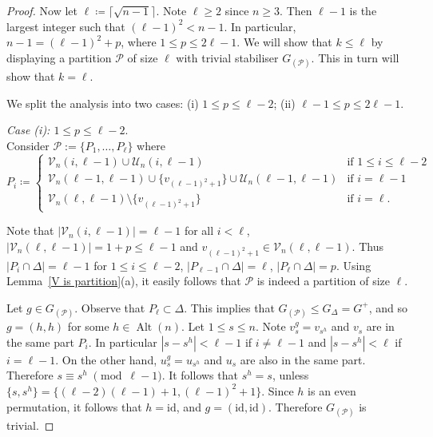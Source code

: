 \documentclass[11pt]{amsart}
\DeclareMathOperator{\Alt}{Alt}
\begin{document}
\begin{proof}
Now let $\ell \coloneqq \lceil \sqrt{n - 1} \rceil$. Note $\ell\geq 2$ since $n\geq 3$.
Then \(\ell-1\) is the largest integer such that \((\ell-1)^{2}<n-1\).
In particular, \(n-1=(\ell-1)^{2}+p\), where \(1 \leqslant p \leqslant 2\ell-1\).  We will show that \(k\leqslant \ell\) by displaying a partition \(\mathcal{P}\) of size \(\ell\) with trivial stabiliser \(G_{(\mathcal{P})}\). This in turn will show that \(k=\ell\).



We split the analysis into two cases: (i) \(1 \leqslant p\leqslant \ell-2\); (ii) \(\ell-1 \leqslant p \leqslant 2\ell-1\).

\emph{Case (i): \(1 \leqslant p\leqslant \ell-2\)}. \\
Consider \(\mathcal{P}:=\{P_{1},\ldots, P_{\ell}\}\) where
\begin{equation*} 
P_{i}  \coloneqq
\begin{cases}
   \mathcal{V}_n(i,\ell-1) \cup \mathcal{U}_n(i,\ell-1)& \text{if } 1\leqslant i \leqslant \ell-2\\ 
    \mathcal{V}_n(\ell-1,\ell-1) \cup \{v_{(\ell-1)^2+1}\}\cup \mathcal{U}_n(\ell-1,\ell-1)& \text{if } i= \ell-1\\ 
   \mathcal{V}_n(\ell,\ell-1)\setminus \{v_{(\ell-1)^2+1}\} & \text{if } i=\ell.
\end{cases}
\end{equation*} 

%
Note that $|\mathcal{V}_n(i,\ell-1)|=\ell-1$ for all $i<\ell$, $|\mathcal{V}_n(\ell,\ell-1)|=1+p\leqslant \ell-1$ and $v_{(\ell-1)^2+1}\in \mathcal{V}_n(\ell,\ell-1)$.
Thus $|P_{i}\cap\Delta|=\ell-1$ for $1\leqslant i \leqslant \ell-2$, $|P_{\ell-1}\cap\Delta|=\ell$, $|P_{\ell}\cap\Delta|=p$. Using Lemma~\ref{V is partition}(a), it easily follows that \(\mathcal{P}\) is indeed a partition of size $\ell$. 

Let \(g\in G_{(\mathcal{P})}\). 
Observe that \(P_{\ell}\subset\Delta\). This implies that \(G_{(\mathcal{P})}\leqslant G_{\Delta}= G^{+}\), and so $g=(h,h)$ for some $h\in \Alt(n)$. 
  Let $1\leqslant s\leqslant n$. Note $v_s^g=v_{s^h}$ and $v_s$ are in the same part $P_i$. In particular $ |s-s^h|<\ell-1$ if $i\neq \ell-1$ and $ |s-s^h|<\ell$ if $i=\ell-1$. On the other hand, $u_s^g=u_{s^h}$ and $u_s$ are also in the same part. Therefore $s\equiv s^h \;\pmod {\ell-1}$. It follows that $s^h=s$, unless $\{s,s^h\}=\{(\ell-2)(\ell-1)+1,(\ell-1)^2+1\}$. Since $h$ is an even permutation, it follows that $h=\mathrm{id}$, and  $g=(\mathrm{id},\mathrm{id}).$
  Therefore $G_{(\mathcal{P})}$ is trivial.   


\end{proof}
\end{document}
